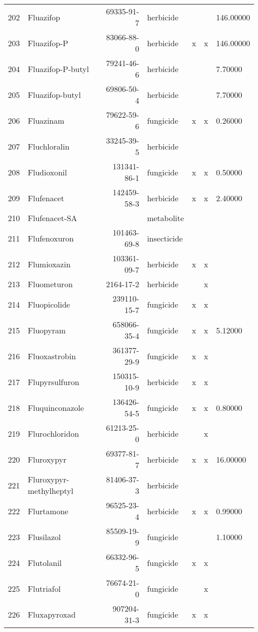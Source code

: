 \begin{longtable}{lp{4cm}rlp{1.3cm}p{1.3cm}p{1.5cm}}
  202 & Fluazifop & 69335-91-7 & herbicide &  &  & 146.00000 \\ 
  203 & Fluazifop-P & 83066-88-0 & herbicide & x & x & 146.00000 \\ 
  204 & Fluazifop-P-butyl & 79241-46-6 & herbicide &  &  & 7.70000 \\ 
  205 & Fluazifop-butyl & 69806-50-4 & herbicide &  &  & 7.70000 \\ 
  206 & Fluazinam & 79622-59-6 & fungicide & x & x & 0.26000 \\ 
  207 & Fluchloralin & 33245-39-5 & herbicide &  &  &  \\ 
  208 & Fludioxonil & 131341-86-1 & fungicide & x & x & 0.50000 \\ 
  209 & Flufenacet & 142459-58-3 & herbicide & x & x & 2.40000 \\ 
  210 & Flufenacet-SA &  & metabolite &  &  &  \\ 
  211 & Flufenoxuron & 101463-69-8 & insecticide &  &  &  \\ 
  212 & Flumioxazin & 103361-09-7 & herbicide & x & x &  \\ 
  213 & Fluometuron & 2164-17-2 & herbicide &  & x &  \\ 
  214 & Fluopicolide & 239110-15-7 & fungicide & x & x &  \\ 
  215 & Fluopyram & 658066-35-4 & fungicide & x & x & 5.12000 \\ 
  216 & Fluoxastrobin & 361377-29-9 & fungicide & x & x &  \\ 
  217 & Flupyrsulfuron & 150315-10-9 & herbicide & x & x &  \\ 
  218 & Fluquinconazole & 136426-54-5 & fungicide & x & x & 0.80000 \\ 
  219 & Flurochloridon & 61213-25-0 & herbicide &  & x &  \\ 
  220 & Fluroxypyr & 69377-81-7 & herbicide & x & x & 16.00000 \\ 
  221 & Fluroxypyr-methylheptyl & 81406-37-3 & herbicide &  &  &  \\ 
  222 & Flurtamone & 96525-23-4 & herbicide & x & x & 0.99000 \\ 
  223 & Flusilazol & 85509-19-9 & fungicide &  &  & 1.10000 \\ 
  224 & Flutolanil & 66332-96-5 & fungicide & x & x &  \\ 
  225 & Flutriafol & 76674-21-0 & fungicide &  & x &  \\ 
  226 & Fluxapyroxad & 907204-31-3 & fungicide & x & x &  \\ 

\end{longtable}
